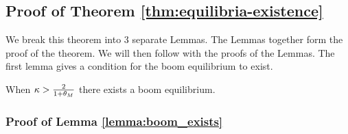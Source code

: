 \subsection{Proof of Theorem \ref{thm:equilibria-existence} }

We break this theorem into 3 separate Lemmas. The Lemmas together form the proof of the theorem. We will then follow with the proofs of the Lemmas. The first lemma gives a condition for the boom equilibrium to exist. 


\noindent \begin{lemma}\label{lemma:boom_exists}
    When $\kappa > \frac{2}{1+\theta_M}$ there exists a boom equilibrium. 
\end{lemma}
\subsubsection{Proof of Lemma \ref{lemma:boom_exists}}
